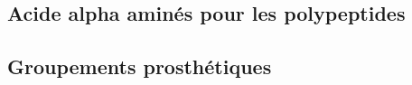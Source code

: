 \begin{boiteCodeTex}{}
  \chemfig{!\alanineL} \quad
  \chemfig{!\alanineD} \quad
  \chemfig{!\valineL} \quad
  \chemfig{!\valineD}
\end{boiteCodeTex}

\subsection{Acide alpha aminés pour les polypeptides}

\begin{boiteCodeTex}{}
\end{boiteCodeTex}

\subsection{Groupements prosthétiques}

\begin{boiteCodeTex}{}
  \chemfig[atom sep = 18pt]{!\hemeB}
\end{boiteCodeTex}
